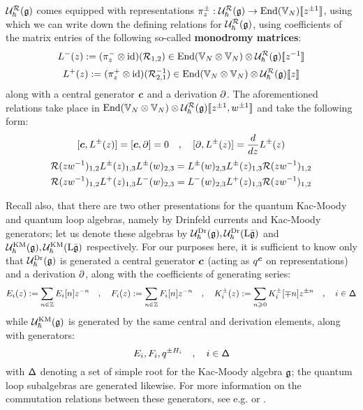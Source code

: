         $\mathcal{U}_{\hbar}^{\mathcal{R}}(\mathfrak{g})$ comes equipped with representations $\pi_z^{\pm}: \mathcal{U}_{\hbar}^{\mathcal{R}}(\mathfrak{g}) \to \operatorname{End}(\mathbb{V}_N)[\![z^{\pm 1}]\!]$, using which we can write down the defining relations for $\mathcal{U}_{\hbar}^{\mathcal{R}}(\mathfrak{g})$, using coefficients of the matrix entries of the following so-called \textbf{monodromy matrices}:
            $$L^-(z) := (\pi_z^- \tensor \id)( \calR_{1, 2} ) \in \End(\bbV_N \tensor \bbV_N) \tensor \calU_{\hbar}^{\calR}(\g)[\![z^{-1}]\!]$$
            $$L^+(z) := (\pi_z^+ \tensor \id)( \calR_{2, 1}^{-1} ) \in \End(\bbV_N \tensor \bbV_N) \tensor \calU_{\hbar}^{\calR}(\g)[\![z]\!]$$
        along with a central generator $\boldsymbol{c}$ and a derivation $\partial$. The aforementioned relations take place in $\End(\bbV_N \tensor \bbV_N) \tensor \calU_{\hbar}^{\calR}(\g)[\![z^{\pm 1}, w^{\pm 1}]\!]$ and take the following form:
            $$[\boldsymbol{c}, L^{\pm}(z)] = [\boldsymbol{c}, \partial] = 0 \quad, \quad [\partial, L^{\pm}(z)] = \frac{d}{dz} L^{\pm}(z)$$
            \begin{equation} \label{equation: FRT_relations}
                \begin{gathered}
                    \mathcal{R}(zw^{-1})_{1, 2} L^{\pm}(z)_{1, 3} L^{\pm}(w)_{2, 3} = L^{\pm}(w)_{2, 3} L^{\pm}(z)_{1, 3} \mathcal{R}(zw^{-1})_{1, 2}
                    \\
                    \mathcal{R}(zw^{-1})_{1, 2} L^+(z)_{1, 3} L^-(w)_{2, 3} = L^-(w)_{2, 3} L^+(z)_{1, 3} \mathcal{R}(zw^{-1})_{1, 2}
                \end{gathered}
            \end{equation}
        
        Recall also, that there are two other presentations for the quantum Kac-Moody and quantum loop algebras, namely by Drinfeld currents and Kac-Moody generators; let us denote these algebras by $\mathcal{U}_{\hbar}^{\mathrm{Dr}}(\mathfrak{g}), \mathcal{U}_{\hbar}^{\mathrm{Dr}}(\mathrm{L} \bar{\mathfrak{g}})$ and $\mathcal{U}_{\hbar}^{\mathrm{KM}}(\mathfrak{g}), \mathcal{U}_{\hbar}^{\mathrm{KM}}(\mathrm{L} \bar{\mathfrak{g}})$ respectively. For our purposes here, it is sufficient to know only that $\mathcal{U}_{\hbar}^{\mathrm{Dr}}(\mathfrak{g})$ is generated a central generator $\boldsymbol{c}$ (acting as $q^{\boldsymbol{c}}$ on representations) and a derivation $\partial$, along with the coefficients of generating series:
            $$E_i(z) := \sum_{n \in \mathbb{Z}} E_i[n] z^{-n} \quad, \quad F_i(z) := \sum_{n \in \mathbb{Z}} F_i[n] z^{-n} \quad, \quad K^{\pm}_i(z) := \sum_{n \geqslant 0} K^{\pm}_i[\mp n] z^{\pm n} \quad, \quad i \in \mathsf{\Delta}$$
        while $\mathcal{U}_{\hbar}^{\mathrm{KM}}(\mathfrak{g})$ is generated by the same central and derivation elements, along with generators:
            $$E_i, F_i, q^{\pm H_i} \quad, \quad i \in \mathsf{\Delta}$$
        with $\mathsf{\Delta}$ denoting a set of simple root for the Kac-Moody algebra $\mathfrak{g}$; the quantum loop subalgebras are generated likewise. For more information on the commutation relations between these generators, see e.g. \cite[Section 2]{ding_pakuliak_khoroshkin_integral_formula_for_R_matrices_of_affine_QUEs} or \cite[Section 3]{frenkel_reshetikhin_affine_QUEs_and_deformed_virasoro_and_finite_W_algebras}. 
        
